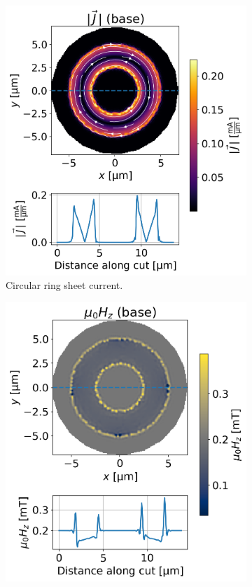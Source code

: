 \documentclass[preprint,12pt]{elsarticle}
\begin{document}
\begin{figure}
\centering
\begin{subfigure}{.4\textwidth}
  \centering
  \includegraphics[width=\linewidth]{examples/images/ring/circular_ring_uniform_plot_currents.png}
  \caption{Circular ring sheet current.}
  \label{fig:circular_ring_plot_currents}
\end{subfigure}
\begin{subfigure}{.4\textwidth}
  \centering
  \includegraphics[width=\linewidth]{examples/images/ring/circular_ring_uniform_plot_fields.png}

\end{subfigure}
\end{figure}
\end{document}
